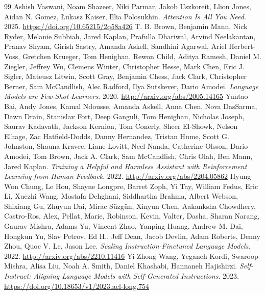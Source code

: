 \documentclass[11pt]{article}
\begin{document}
\begin{thebibliography}{99}
 Ashish Vaswani, Noam Shazeer, Niki Parmar, Jakob Uszkoreit, Llion Jones, Aidan N. Gomez, Łukasz Kaiser, Illia Polosukhin. \emph{Attention Is All You Need}. 2025. \url{https://doi.org/10.65215/2q58a426}
 T. B. Brown, Benjamin Mann, Nick Ryder, Melanie Subbiah, Jared Kaplan, Prafulla Dhariwal, Arvind Neelakantan, Pranav Shyam, Girish Sastry, Amanda Askell, Sandhini Agarwal, Ariel Herbert-Voss, Gretchen Krueger, Tom Henighan, Rewon Child, Aditya Ramesh, Daniel M. Ziegler, Jeffrey Wu, Clemens Winter, Christopher Hesse, Mark Chen, Eric J. Sigler, Mateusz Litwin, Scott Gray, Benjamin Chess, Jack Clark, Christopher Berner, Sam McCandlish, Alec Radford, Ilya Sutskever, Dario Amodei. \emph{Language Models are Few-Shot Learners}. 2020. \url{http://arxiv.org/abs/2005.14165}
 Yuntao Bai, Andy Jones, Kamal Ndousse, Amanda Askell, Anna Chen, Nova DasSarma, Dawn Drain, Stanislav Fort, Deep Ganguli, Tom Henighan, Nicholas Joseph, Saurav Kadavath, Jackson Kernion, Tom Conerly, Sheer El-Showk, Nelson Elhage, Zac Hatfield-Dodds, Danny Hernandez, Tristan Hume, Scott G. Johnston, Shauna Kravec, Liane Lovitt, Neel Nanda, Catherine Olsson, Dario Amodei, Tom Brown, Jack A. Clark, Sam McCandlish, Chris Olah, Ben Mann, Jared Kaplan. \emph{Training a Helpful and Harmless Assistant with Reinforcement Learning from Human Feedback}. 2022. \url{http://arxiv.org/abs/2204.05862}
 Hyung Won Chung, Le Hou, Shayne Longpre, Barret Zoph, Yi Tay, William Fedus, Eric Li, Xuezhi Wang, Mostafa Dehghani, Siddhartha Brahma, Albert Webson, Shixiang Gu, Zhuyun Dai, Mirac Süzgün, Xinyun Chen, Aakanksha Chowdhery, Castro-Ros, Alex, Pellat, Marie, Robinson, Kevin, Valter, Dasha, Sharan Narang, Gaurav Mishra, Adams Yu, Vincent Zhao, Yanping Huang, Andrew M. Dai, Hongkun Yu, Slav Petrov, Ed H., Jeff Dean, Jacob Devlin, Adam Roberts, Denny Zhou, Quoc V. Le, Jason Lee. \emph{Scaling Instruction-Finetuned Language Models}. 2022. \url{http://arxiv.org/abs/2210.11416}
 Yi‐Zhong Wang, Yeganeh Kordi, Swaroop Mishra, Alisa Liu, Noah A. Smith, Daniel Khashabi, Hannaneh Hajishirzi. \emph{Self-Instruct: Aligning Language Models with Self-Generated Instructions}. 2023. \url{https://doi.org/10.18653/v1/2023.acl-long.754}

\end{thebibliography}
\end{document}
